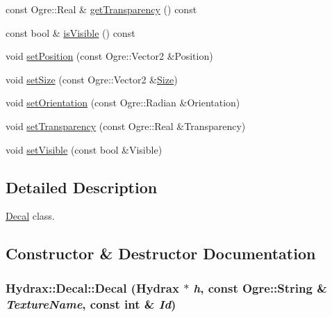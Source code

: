 \begin{CompactItemize}
const Ogre::Real \& \hyperlink{class_hydrax_1_1_decal_92b9f0ae7ac23d87d9fe6415352c87c7}{getTransparency} () const 
\item 
const bool \& \hyperlink{class_hydrax_1_1_decal_8193d57f867ddb8293da95cd1473af42}{isVisible} () const 
\item 
void \hyperlink{class_hydrax_1_1_decal_53da5b1cb4fc6d8cd470d23255cbcc7a}{setPosition} (const Ogre::Vector2 \&Position)
\item 
void \hyperlink{class_hydrax_1_1_decal_e48299846460ba4022683faba3f826be}{setSize} (const Ogre::Vector2 \&\hyperlink{struct_hydrax_1_1_size}{Size})
\item 
void \hyperlink{class_hydrax_1_1_decal_5dc16dca9688e2bb46f0770a7375902c}{setOrientation} (const Ogre::Radian \&Orientation)
\item 
void \hyperlink{class_hydrax_1_1_decal_c1f66263a33a56b806ea08fb05b47951}{setTransparency} (const Ogre::Real \&Transparency)
\item 
void \hyperlink{class_hydrax_1_1_decal_5c51a36fc2d8c6f320db291805b8401a}{setVisible} (const bool \&Visible)
\end{CompactItemize}


\subsection{Detailed Description}
\hyperlink{class_hydrax_1_1_decal}{Decal} class. 

\subsection{Constructor \& Destructor Documentation}
\hypertarget{class_hydrax_1_1_decal_85bc65b9ca9265d69693da7a90d3382e}{
\subsubsection[{Decal}]{\setlength{\rightskip}{0pt plus 5cm}Hydrax::Decal::Decal ({\bf Hydrax} $\ast$ {\em h}, \/  const Ogre::String \& {\em TextureName}, \/  const int \& {\em Id})}}
\label{class_hydrax_1_1_decal_85bc65b9ca9265d69693da7a90d3382e}


